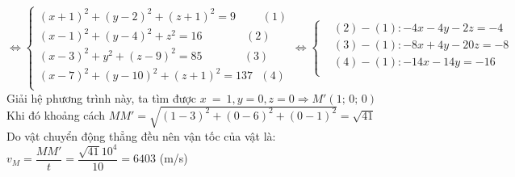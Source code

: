 \begin{ex}
{		$\Leftrightarrow\left\{\begin{matrix}
				{\left(x+1\right)^2}+\left(y-2\right)^2+\left(z+1\right)^2=9\,\,\,\,\,\,\,\,\,\,\,\,\,\,(1)     \\
				{\left(x-1\right)^2}+\left(y-4\right)^2+z^2=16\,\,\,\,\,\,\,\,\,\,\,\,\,\,\,\,\,\,\,\,\,\,\,(2) \\
				{\left(x-3\right)^2}+y^2+\left(z-9\right)^2=85\,\,\,\,\,\,\,\,\,\,\,\,\,\,\,\,\,\,\,\,\,\,(3)   \\
				{\left(x-7\right)^2}+\left(y-10\right)^2+\left(z+1\right)^2=137\,\,\,\,(4)                      \\
			\end{matrix}\right.\Leftrightarrow\left\{\begin{aligned}
				 & (2)-(1):-4x-4y-2z=-4  \\
				 & (3)-(1):-8x+4y-20z=-8 \\
				 & (4)-(1):-14x-14y=-16  \\
			\end{aligned}\right.$\\
		Giải hệ phương trình này, ta tìm được $x~=~1,y=0,z=0\Rightarrow{M}'\left(1;\,0;\,0\right)$\\
		Khi đó khoảng cách $M{M}'=\sqrt{\left(1-3\right)^2+\left(0-6\right)^2+\left(0-1\right)^2}=\sqrt{41}$\\
		Do vật chuyển động thẳng đều nên vận tốc của vật là: $v_M=\dfrac{M{M}'}{t}=\dfrac{\sqrt{41}{10^4}}{10}=6403$ (m/s)
	}
\end{ex}
